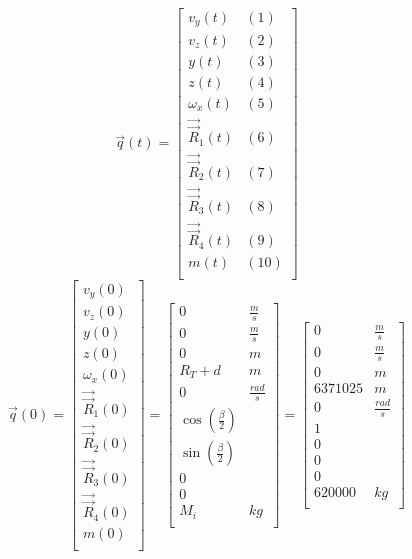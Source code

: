 \documentclass{article}
\begin{document}
\begin{equation}
\vec{q}(t) = 
\begin{bmatrix}
    v_y(t) & (1)\\
    v_z(t) & (2)\\
    y(t) & (3)\\
    z(t) & (4)\\
    \omega_x(t) & (5)\\
    \vec{\vec{R}}_1(t) & (6)\\
    \vec{\vec{R}}_2(t) & (7)\\
    \vec{\vec{R}}_3(t) & (8)\\
    \vec{\vec{R}}_4(t) & (9)\\
    m(t) & (10)\\
\end{bmatrix}
\end{equation}
\begin{equation}
\vec{q}(0) = 
\begin{bmatrix}
    v_y(0)  \\
    v_z(0)  \\
    y(0) \\
    z(0) \\
    \omega_x(0) \\
    \vec{\vec{R}}_1(0) \\
    \vec{\vec{R}}_2(0) \\
    \vec{\vec{R}}_3(0) \\
    \vec{\vec{R}}_4(0) \\
    m(0) \\
\end{bmatrix}
=
\begin{bmatrix}
    0 & \frac{m}{s}\\
    0 & \frac{m}{s}\\
    0 & m\\
    R_T + d & m \\
    0 & \frac{rad}{s} \\
    \cos(\frac{\beta}{2}) & \\
    \sin(\frac{\beta}{2}) & \\
    0 & \\
    0 & \\
    M_i & kg \\
\end{bmatrix}
=
\begin{bmatrix}
    0 & \frac{m}{s}\\
    0 & \frac{m}{s}\\
    0 & m\\
    6 371 025 & m \\
    0 & \frac{rad}{s} \\
    1 &  \\
    0 &  \\
    0 & \\
    0 & \\
    620 000 & kg \\
\end{bmatrix}
\end{equation}
\end{document}

